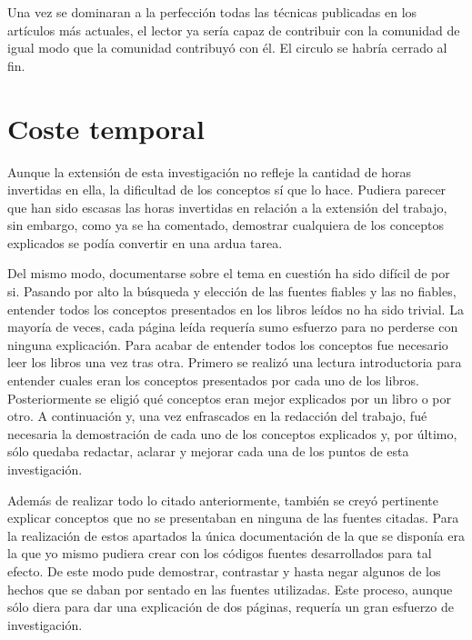 \documentclass [titlepage, 12pt]{article}
\begin{document}
Una vez se dominaran a la perfecci\'on todas las t\'ecnicas publicadas en los art\'iculos m\'as actuales, el lector ya ser\'ia capaz de contribuir con la comunidad de igual modo que la comunidad contribuy\'o con \'el. El circulo se habr\'ia cerrado al fin.  

\pagebreak

\section{Coste temporal}
\bigskip

Aunque la extensi\'on de esta investigaci\'on no refleje la cantidad de horas invertidas en ella, la dificultad de los conceptos s\'i que lo hace. Pudiera parecer que han sido escasas las horas invertidas en relaci\'on a la extensi\'on del trabajo, sin embargo, como ya se ha comentado, demostrar cualquiera de los conceptos explicados se pod\'ia convertir en una ardua tarea. \bigskip

Del mismo modo, documentarse sobre el tema en cuesti\'on ha sido dif\'icil de por si. Pasando por alto la b\'usqueda y elecci\'on de las fuentes fiables y las no fiables, entender todos los conceptos presentados en los libros le\'idos no ha sido trivial. La mayor\'ia de veces, cada p\'agina le\'ida requer\'ia sumo esfuerzo para no perderse con ninguna explicaci\'on. Para acabar de entender todos los conceptos fue necesario leer los libros una vez tras otra. Primero se realiz\'o una lectura introductoria para entender cuales eran los conceptos presentados por cada uno de los libros. Posteriormente se eligi\'o qu\'e conceptos eran mejor explicados por un libro o por otro. A continuaci\'on y, una vez enfrascados en la redacci\'on del trabajo, fu\'e necesaria la demostraci\'on de cada uno de los conceptos explicados y, por \'ultimo, s\'olo quedaba redactar, aclarar y mejorar cada una de los puntos de esta investigaci\'on.\bigskip

Adem\'as de realizar todo lo citado anteriormente, tambi\'en se crey\'o pertinente explicar conceptos que no se presentaban en ninguna de las fuentes citadas. Para la realizaci\'on de estos apartados la \'unica documentaci\'on de la que se dispon\'ia era la que yo mismo pudiera crear con los c\'odigos fuentes desarrollados para tal efecto. De este modo pude demostrar, contrastar y hasta negar algunos de los hechos que se daban por sentado en las fuentes utilizadas. Este proceso, aunque s\'olo diera para dar una explicaci\'on de dos p\'aginas, requer\'ia un gran esfuerzo de investigaci\'on. \bigskip
\end{document}
